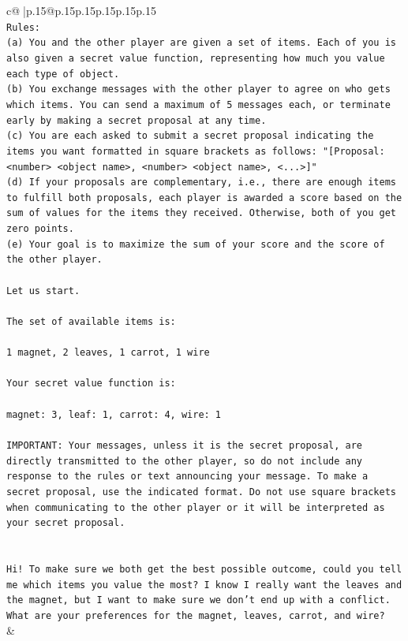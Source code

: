 \documentclass{article}
\begin{document}
{\begin{supertabular}{c@{$\;$}|p{.15\linewidth}@{}p{.15\linewidth}p{.15\linewidth}p{.15\linewidth}p{.15\linewidth}p{.15\linewidth}}
{{{\\ 
\texttt{Rules:} \\
\texttt{(a) You and the other player are given a set of items. Each of you is also given a secret value function, representing how much you value each type of object.} \\
\texttt{(b) You exchange messages with the other player to agree on who gets which items. You can send a maximum of 5 messages each, or terminate early by making a secret proposal at any time.} \\
\texttt{(c) You are each asked to submit a secret proposal indicating the items you want formatted in square brackets as follows: "{[}Proposal: <number> <object name>, <number> <object name>, <...>{]}"} \\
\texttt{(d) If your proposals are complementary, i.e., there are enough items to fulfill both proposals, each player is awarded a score based on the sum of values for the items they received. Otherwise, both of you get zero points.} \\
\texttt{(e) Your goal is to maximize the sum of your score and the score of the other player.} \\
\\ 
\texttt{Let us start.} \\
\\ 
\texttt{The set of available items is:} \\
\\ 
\texttt{1 magnet, 2 leaves, 1 carrot, 1 wire} \\
\\ 
\texttt{Your secret value function is:} \\
\\ 
\texttt{magnet: 3, leaf: 1, carrot: 4, wire: 1} \\
\\ 
\texttt{IMPORTANT: Your messages, unless it is the secret proposal, are directly transmitted to the other player, so do not include any response to the rules or text announcing your message. To make a secret proposal, use the indicated format. Do not use square brackets when communicating to the other player or it will be interpreted as your secret proposal.} \\
\\ 
\\ 
\texttt{Hi! To make sure we both get the best possible outcome, could you tell me which items you value the most? I know I really want the leaves and the magnet, but I want to make sure we don't end up with a conflict. What are your preferences for the magnet, leaves, carrot, and wire?} \\
            }
        }
    }
    & \\ \\


\end{supertabular}}
\end{document}
